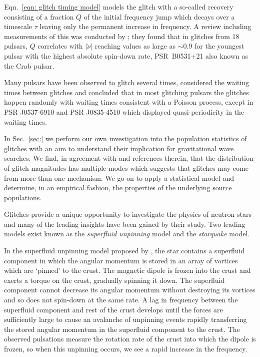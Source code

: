 Eqn.~\eqref{eqn: glitch timing model} models the glitch with a so-called recovery
consisting of a fraction $Q$ of the initial frequency jump which decays over
a timescale $\tau$ leaving only the permanent increase in frequency. A review
including measurements of this was conducted by \citet{Lyne2000}; they found
that in glitches from 18 pulsars, $Q$ correlates with $|\dot{\nu}|$ reaching
values as large as $\sim0.9$ for the youngest pulsar with the highest absolute
spin-down rate, PSR~B0531+21 also known as the Crab pulsar.

Many pulsars have been observed to glitch several times, \citet{Melatos2008}
considered the waiting times between glitches and concluded that in most
glitching pulsars the glitches happen randomly with waiting times consistent
with a Poisson process, except in PSR J0537-6910 and PSR J0835-4510 which
displayed quasi-periodicity in the waiting times.

In Sec.~\ref{sec:} we perform our own investigation into the population
statistics of glitches with an aim to understand their implication for
gravitational wave searches. We find, in agreement with \citet{Espinoza2011}
and references therein, that the distribution of glitch magnitudes has multiple
modes which suggests that glitches may come from more than one mechanism. We go
on to apply a statistical model and determine, in an empirical fashion, the
properties of the underlying source populations.

Glitches provide a unique opportunity to investigate the physics of neutron stars
and many of the leading insights have been gained by their study. Two leading
models exist known as the \emph{superfluid unpinning} model and the \emph{starquake} model.

In the superfluid unpinning model proposed by \citet{Anderson1975}, the star
contains a superfluid component in which the angular momentum is stored in an
array of vortices which are `pinned' to the crust. The magnetic dipole is
frozen into the crust and exerts a torque on the crust, gradually spinning it
down. The superfluid component cannot decrease its angular momentum without
destroying its vortices and so does not spin-down at the same rate.  A lag in
frequency between the superfluid component and rest of the crust develops until
the forces are sufficiently large to cause an avalanche of unpinning events
rapidly transferring the stored angular momentum in the superfluid component to
the crust. The observed pulsations measure the rotation rate of the crust into
which the dipole is frozen, so when this unpinning occurs, we see a rapid
increase in the frequency.


